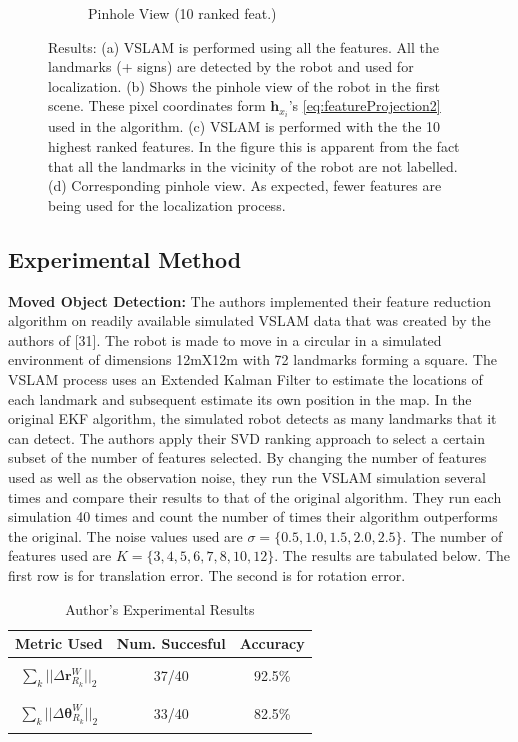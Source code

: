 \documentclass[10pt,twocolumn,letterpaper]{article}
\begin{document}
\begin{figure}[t!]
\begin{subfigure}[b]{0.25\textwidth}
                \caption{Pinhole View (10 ranked feat.)}
                \label{fig:mouse}
        \end{subfigure}
        \caption{Results: (a) VSLAM is performed using all the features. All the landmarks (+ signs) are detected by the robot and used for localization. (b) Shows the pinhole view of the robot in the first scene. These pixel coordinates form $\boldsymbol{h}_{x_i}$'s \eqref{eq:featureProjection2} used in the algorithm. (c) VSLAM is performed with the the 10 highest ranked features. In the figure this is apparent from the fact that all the landmarks in the vicinity of the robot are not labelled. (d) Corresponding pinhole view. As expected, fewer features are being used for the localization process. }\label{fig:animals}
\end{figure}
\subsection{Experimental Method}
\textbf{Moved Object Detection:} The authors implemented their feature reduction algorithm on readily 
available simulated VSLAM data that was created by the authors of 
[31]. 
The robot is made to move in a circular in a simulated environment of dimensions 12mX12m with 72 
landmarks forming a square. The VSLAM process uses an Extended Kalman Filter to estimate the locations 
of each landmark and subsequent estimate its own position in the map. In the original EKF algorithm, the 
simulated robot detects as many landmarks that it can detect. The authors apply their SVD ranking approach
 to select a certain subset of the number of features selected. By changing the number of features used as 
 well as the observation noise, they run the VSLAM simulation several times and compare their results to 
 that of the original algorithm. They run each simulation 40 times and count the number of times their 
 algorithm outperforms the original. The noise values used are $\sigma=\{0.5, 1.0, 1.5, 2.0, 2.5\} $. 
The number of features used are $ K = \{ 3, 4, 5, 6, 7, 8, 10, 12 \}$. 
The results are tabulated below. 
The first row is for translation error. The second is for rotation error.
\begin{table}[h]
\begin{center}
\begin{tabular}{|c|c|c|}
\hline
Metric Used & Num. Succesful & Accuracy  \\
\hline
  &   &   \\
$ \sum_k || \Delta \boldsymbol{r}_{R_k}^W ||_2 $ & 37/40 & 92.5\% \\
  &   &   \\
\hline
  &   &   \\
$ \sum_k || \Delta \boldsymbol{\theta}_{R_k}^W ||_2 $ & 33/40 & 82.5\% \\
  &   &   \\
\hline
\end{tabular}
\end{center}
\caption{Author's Experimental Results}
\end{table}
\end{document}
